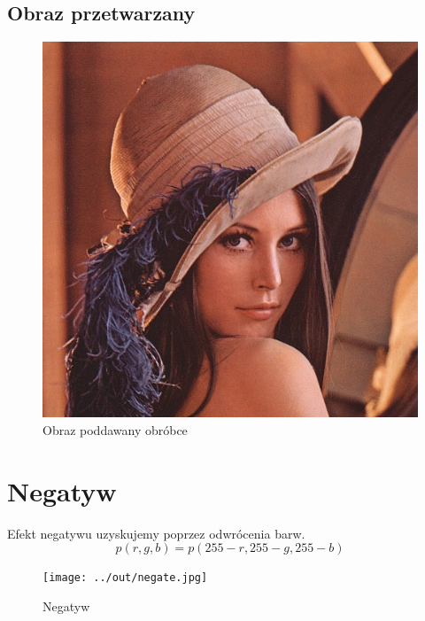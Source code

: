 \documentclass[a4paper,12pt]{article}
\begin{document}
\subsection{Obraz przetwarzany}
\begin{figure}[h!]
   \centering
   \includegraphics[width=15cm]{../../lena.jpg}
   \caption{Obraz poddawany obróbce}
\end{figure}


\newpage
\section{Negatyw}
Efekt negatywu uzyskujemy poprzez odwrócenia barw.
$$p(r, g, b) = p(255-r, 255-g, 255-b)$$
\begin{figure}[h!]
   \centering
   \texttt{[image: ../out/negate.jpg]}
   \caption{Negatyw}
\end{figure}


\newpage
\end{document}
